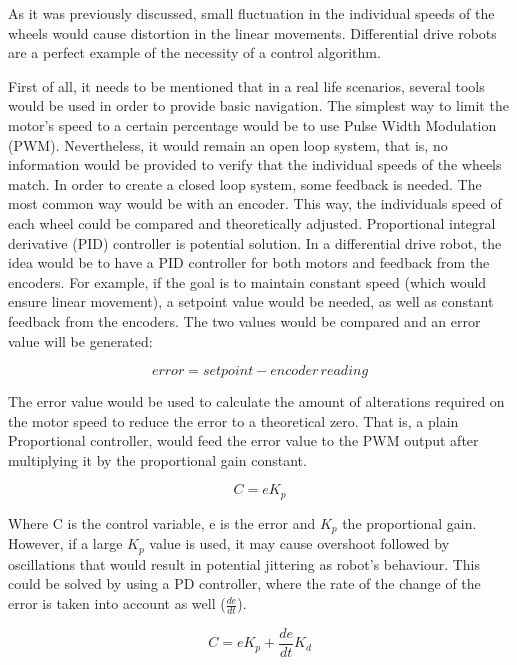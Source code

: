 As it was previously discussed, small fluctuation in the individual speeds of the wheels would cause distortion in the linear movements. Differential drive robots are a perfect example of the necessity of a control algorithm.

First of all, it needs to be mentioned that in a real life scenarios, several tools would be used in order to provide basic navigation. The simplest way to limit the motor's speed to a certain percentage would be to use Pulse Width Modulation (PWM). Nevertheless, it would remain an open loop system, that is, no information would be provided to verify that the individual speeds of  the wheels match. In order to create a closed loop system, some feedback is needed. The most common way would be with an encoder. This way, the individuals speed of each wheel could be compared and theoretically adjusted. 
Proportional integral derivative (PID) controller is potential solution. In a differential drive robot, the idea would be to have a PID controller for both motors and feedback from the encoders. For example, if the goal is to maintain constant speed (which would ensure linear movement), a setpoint value would be needed, as well as constant feedback from the encoders. The two values would be compared and an error value will be generated:\cite{PID}

\begin{equation}
error = setpoint - encoder\,reading
\end{equation}

The error value would be used to calculate the amount of alterations required on the motor speed to reduce the error to a theoretical zero. That is, a plain Proportional controller, would feed the error value to the PWM output after multiplying it by the proportional gain constant. 

\begin{equation}
C = eK_p 
\end{equation}

Where C is the control variable, e is the error and $K_p$ the proportional gain. 
However, if a large $K_p$ value is used, it may cause overshoot followed by oscillations that would result in potential jittering as robot's behaviour. This could be solved by using a PD controller, where the rate of the change of the error is taken into account as well ($\frac{de}{dt}$). 

\begin{equation}
C = eK_p + \frac{de}{dt}K_d
\end{equation}


